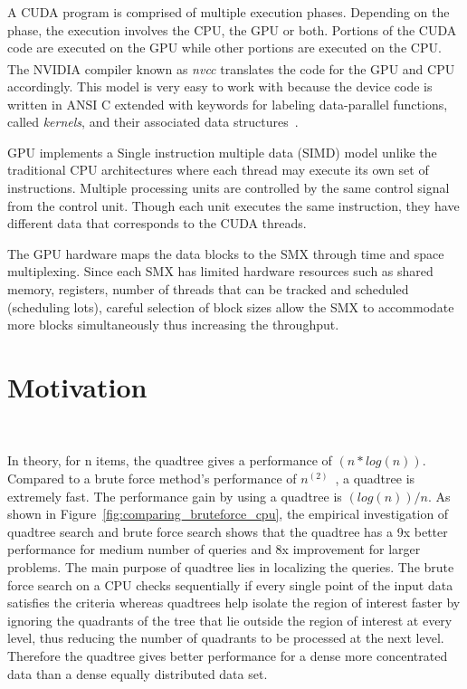 A CUDA program
is comprised of multiple execution phases. Depending on the phase,
the execution involves the CPU, the GPU or both. Portions of the CUDA
code are executed on the GPU while other portions are executed on the
CPU.  The NVIDIA\textsuperscript{\textregistered} compiler known as
\textit{nvcc} translates the code for the GPU and CPU accordingly.
This model is very easy to work with because the device code is
written in ANSI C extended with keywords for labeling data-parallel
functions, called \textit{kernels}, and their associated data
structures~\cite{owens:08:gc}.

GPU implements a Single instruction multiple data (SIMD) model unlike the traditional CPU architectures where each thread may execute its own set of instructions. Multiple processing units are controlled by the same control signal from the control unit. Though each unit executes the same instruction, they have different data that corresponds to the CUDA threads.

 The GPU hardware maps the data blocks to the SMX through time and space multiplexing. Since each SMX has limited hardware resources such as shared memory, registers, number of threads that can be tracked and scheduled (scheduling lots), careful selection of block sizes allow the SMX to accommodate more blocks simultaneously thus increasing the throughput. 
 

\section{Motivation}~\label{sec:motivation}

In theory, for n items, the quadtree gives a performance of
${(n*log(n))}$. Compared to a brute force method's performance of
$n^{(2)}$~\cite{Eppstein:2000:FHC:351827.351829}, a quadtree is extremely fast. The performance gain by
using a quadtree is ${(log(n))/n}$.  As shown in
Figure~\ref{fig:comparing_bruteforce_cpu}, the empirical investigation
of quadtree search and brute force search shows that the quadtree has
a 9x better performance for medium number of queries and 8x
improvement for larger problems.  The main purpose of quadtree lies in
localizing the queries. The brute force search on a CPU checks
sequentially if every single point of the input data satisfies the
criteria whereas quadtrees help isolate the region of interest faster
by ignoring the quadrants of the tree that lie outside the region of
interest at every level, thus reducing the number of quadrants to be
processed at the next level. Therefore the quadtree gives better
performance for a dense more concentrated data than a dense equally
distributed data set.


